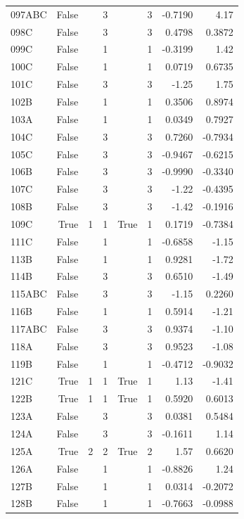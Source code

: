 {\begin{longtable}{lrrrrrrr}
  097ABC & False &  & 3 &  & 3 & -0.7190 & 4.17 \\
  098C & False &  & 3 &  & 3 & 0.4798 & 0.3872 \\
  099C & False &  & 1 &  & 1 & -0.3199 & 1.42 \\
  100C & False &  & 1 &  & 1 & 0.0719 & 0.6735 \\
  101C & False &  & 3 &  & 3 & -1.25 & 1.75 \\
  102B & False &  & 1 &  & 1 & 0.3506 & 0.8974 \\
  103A & False &  & 1 &  & 1 & 0.0349 & 0.7927 \\
  104C & False &  & 3 &  & 3 & 0.7260 & -0.7934 \\
  105C & False &  & 3 &  & 3 & -0.9467 & -0.6215 \\
  106B & False &  & 3 &  & 3 & -0.9990 & -0.3340 \\
  107C & False &  & 3 &  & 3 & -1.22 & -0.4395 \\
  108B & False &  & 3 &  & 3 & -1.42 & -0.1916 \\
  109C & True & 1 & 1 & True & 1 & 0.1719 & -0.7384 \\
  111C  & False &  & 1 &  & 1 & -0.6858 & -1.15 \\
  113B & False &  & 1 &  & 1 & 0.9281 & -1.72 \\
  114B & False &  & 3 &  & 3 & 0.6510 & -1.49 \\
  115ABC & False &  & 3 &  & 3 & -1.15 & 0.2260 \\
  116B & False &  & 1 &  & 1 & 0.5914 & -1.21 \\
  117ABC & False &  & 3 &  & 3 & 0.9374 & -1.10 \\
  118A & False &  & 3 &  & 3 & 0.9523 & -1.08 \\
  119B & False &  & 1 &  & 1 & -0.4712 & -0.9032 \\
  121C & True & 1 & 1 & True & 1 & 1.13 & -1.41 \\
  122B & True & 1 & 1 & True & 1 & 0.5920 & 0.6013 \\
  123A & False &  & 3 &  & 3 & 0.0381 & 0.5484 \\
  124A & False &  & 3 &  & 3 & -0.1611 & 1.14 \\
  125A & True & 2 & 2 & True & 2 & 1.57 & 0.6620 \\
  126A & False &  & 1 &  & 1 & -0.8826 & 1.24 \\
  127B & False &  & 1 &  & 1 & 0.0314 & -0.2072 \\
  128B & False &  & 1 &  & 1 & -0.7663 & -0.0988 \\

\end{longtable}}
